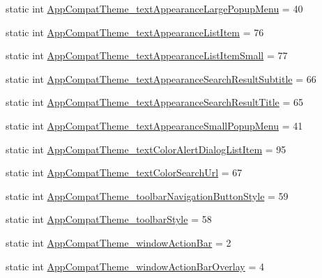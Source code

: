 \begin{DoxyCompactItemize}
\item 
static int \hyperlink{classandroid_1_1support_1_1v7_1_1cardview_1_1R_1_1styleable_afe291a8800123e67953b2ed9511c4a9a}{App\+Compat\+Theme\+\_\+text\+Appearance\+Large\+Popup\+Menu} = 40
\item 
static int \hyperlink{classandroid_1_1support_1_1v7_1_1cardview_1_1R_1_1styleable_a8f72667dec9ee05cdbf2e2619848768c}{App\+Compat\+Theme\+\_\+text\+Appearance\+List\+Item} = 76
\item 
static int \hyperlink{classandroid_1_1support_1_1v7_1_1cardview_1_1R_1_1styleable_a0dbb87b74ed823cda913ce4dc15a0df3}{App\+Compat\+Theme\+\_\+text\+Appearance\+List\+Item\+Small} = 77
\item 
static int \hyperlink{classandroid_1_1support_1_1v7_1_1cardview_1_1R_1_1styleable_a5c6429ab74191c03ded7047f5aa85f30}{App\+Compat\+Theme\+\_\+text\+Appearance\+Search\+Result\+Subtitle} = 66
\item 
static int \hyperlink{classandroid_1_1support_1_1v7_1_1cardview_1_1R_1_1styleable_a1b75dd408c582ec70493e7f69ec4ad8e}{App\+Compat\+Theme\+\_\+text\+Appearance\+Search\+Result\+Title} = 65
\item 
static int \hyperlink{classandroid_1_1support_1_1v7_1_1cardview_1_1R_1_1styleable_a5c5300533d341ed70cf8866e7cea0fab}{App\+Compat\+Theme\+\_\+text\+Appearance\+Small\+Popup\+Menu} = 41
\item 
static int \hyperlink{classandroid_1_1support_1_1v7_1_1cardview_1_1R_1_1styleable_a730df5f1aaa02f6f44026aa8cd716f2a}{App\+Compat\+Theme\+\_\+text\+Color\+Alert\+Dialog\+List\+Item} = 95
\item 
static int \hyperlink{classandroid_1_1support_1_1v7_1_1cardview_1_1R_1_1styleable_af07efe85225b786325d19d1acd12a0a9}{App\+Compat\+Theme\+\_\+text\+Color\+Search\+Url} = 67
\item 
static int \hyperlink{classandroid_1_1support_1_1v7_1_1cardview_1_1R_1_1styleable_a6ccca53fe196080e3926237eed8f3b67}{App\+Compat\+Theme\+\_\+toolbar\+Navigation\+Button\+Style} = 59
\item 
static int \hyperlink{classandroid_1_1support_1_1v7_1_1cardview_1_1R_1_1styleable_ad3252ce0472f8a493dfefb321b238ec9}{App\+Compat\+Theme\+\_\+toolbar\+Style} = 58
\item 
static int \hyperlink{classandroid_1_1support_1_1v7_1_1cardview_1_1R_1_1styleable_a447b7ac42a9d74fe8464e5d6fdeaba6c}{App\+Compat\+Theme\+\_\+window\+Action\+Bar} = 2
\item 
static int \hyperlink{classandroid_1_1support_1_1v7_1_1cardview_1_1R_1_1styleable_a283227c3d60e7ad20f595ff0f405c274}{App\+Compat\+Theme\+\_\+window\+Action\+Bar\+Overlay} = 4

\end{DoxyCompactItemize}
